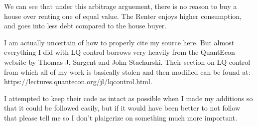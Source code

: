 \documentclass[10pt]{paper}
\begin{document}
We can see that under this arbitrage arguement, there is no reason to
buy a house over renting one of equal value. The Renter enjoys higher
consumption, and goes into less debt compared to the house
buyer. 


I am actually uncertain of how to properly cite my source here. But
almost everything I did with LQ control borrows very heavily from the
QuantEcon website by Thomas J. Sargent and John Stachurski. Their
section on LQ control from which all of my work is basically stolen
and then modified can be found at:
https://lectures.quantecon.org/jl/lqcontrol.html.


I attempted to keep their code as intact as possible when I made my
additions so that it could be followed easily, but if it would have
been better to not follow that please tell me so I don't plaigerize on
something much more important. 
\end{document}
